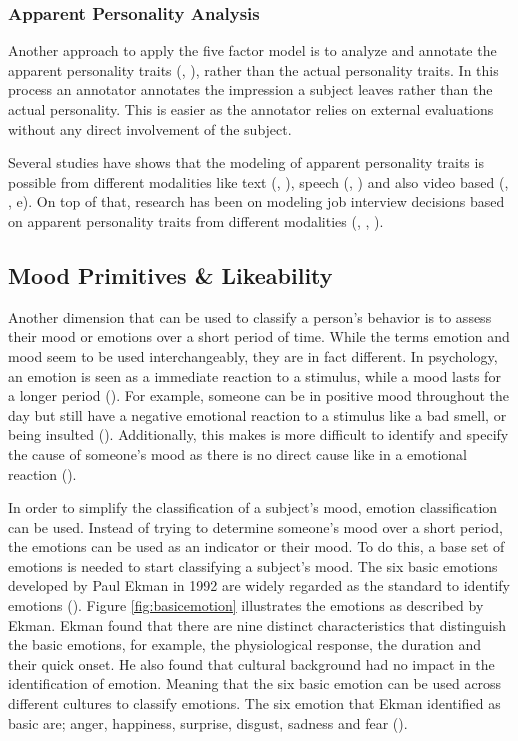 \subsubsection{Apparent Personality Analysis}

Another approach to apply the five factor model is to analyze and annotate the apparent personality traits (\cite{junior2018first}, \cite{chen2016overcoming}), rather than the actual personality traits. In this process an annotator annotates the impression a subject leaves rather than the actual personality. This is easier as the annotator relies on external evaluations without any direct involvement of the subject. 

Several studies have shows that the modeling of apparent personality traits is possible from different modalities like text (\cite{gievska2014impact}, \cite{alam2013personality}), speech (\cite{valente2012annotation}, \cite{madzlan2014towards}) and also video based (\cite{junior2018first}, \cite{qin2016modern}, \cite{escalante2020modeling}e). On top of that, research has been on modeling job interview decisions based on apparent personality traits from different modalities (\cite{kaya2017multi}, \cite{kaya2018multimodal}, \cite{yu2019multimodal}).

\subsection{Mood Primitives \& Likeability}
Another dimension that can be used to classify a person's behavior is to assess their mood or emotions over a short period of time. While the terms emotion and mood seem to be used interchangeably, they are in fact different. In psychology, an emotion is seen as a immediate reaction to a stimulus, while a mood lasts for a longer period (\cite{bower2000affectmemory}). For example, someone can be in positive mood throughout the day but still have a negative emotional reaction to a stimulus like a bad smell, or being insulted (\cite{matlin2012cognition}). Additionally, this makes is more difficult to identify and specify the cause of someone's mood as there is no direct cause like in a emotional reaction (\cite{desmet2016mood}).

In order to simplify the classification of a subject's mood, emotion classification can be used. Instead of trying to determine someone's mood over a short period, the emotions can be used as an indicator or their mood. To do this, a base set of emotions is needed to start classifying a subject's mood. The six basic emotions developed by Paul Ekman in 1992 are widely regarded as the standard to identify emotions (\cite{ekman1992argument}). Figure \ref{fig:basicemotion} illustrates the emotions as described by Ekman. Ekman found that there are nine distinct characteristics that distinguish the basic emotions, for example, the physiological response, the duration and their quick onset. He also found that cultural background had no impact in the identification of emotion. Meaning that the six basic emotion can be used across different cultures to classify emotions. The six emotion that Ekman identified as basic are; anger, happiness, surprise, disgust, sadness and fear (\cite{ekman1992argument}). 

